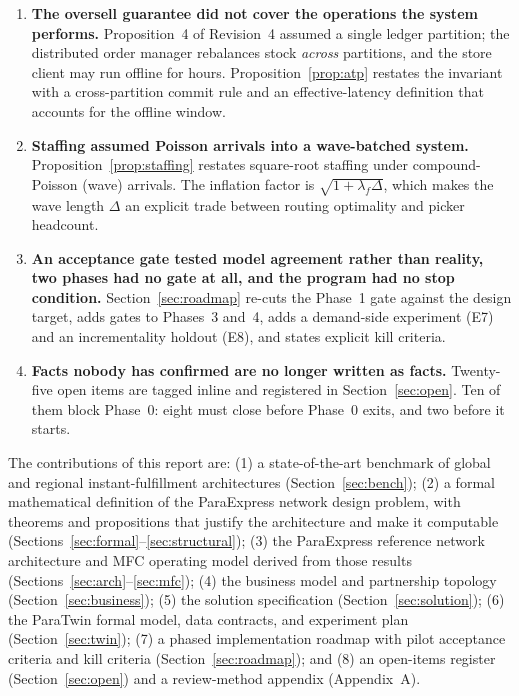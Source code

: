 \begin{enumerate}
\item \textbf{The oversell guarantee did not cover the operations the system performs.} Proposition~4 of Revision~4 assumed a single ledger partition; the distributed order manager rebalances stock \emph{across} partitions, and the store client may run offline for hours. Proposition~\ref{prop:atp} restates the invariant with a cross-partition commit rule and an effective-latency definition that accounts for the offline window.
\item \textbf{Staffing assumed Poisson arrivals into a wave-batched system.} Proposition~\ref{prop:staffing} restates square-root staffing under compound-Poisson (wave) arrivals. The inflation factor is $\sqrt{1+\lambda_f\Delta}$, which makes the wave length $\Delta$ an explicit trade between routing optimality and picker headcount.
\item \textbf{An acceptance gate tested model agreement rather than reality, two phases had no gate at all, and the program had no stop condition.} Section~\ref{sec:roadmap} re-cuts the Phase~1 gate against the design target, adds gates to Phases~3 and~4, adds a demand-side experiment (E7) and an incrementality holdout (E8), and states explicit kill criteria.
\item \textbf{Facts nobody has confirmed are no longer written as facts.} Twenty-five open items are tagged inline and registered in Section~\ref{sec:open}. Ten of them block Phase~0: eight must close before Phase~0 exits, and two before it starts.
\end{enumerate}

The contributions of this report are: (1) a state-of-the-art benchmark of global and regional instant-fulfillment architectures (Section~\ref{sec:bench}); (2) a formal mathematical definition of the ParaExpress network design problem, with theorems and propositions that justify the architecture and make it computable (Sections~\ref{sec:formal}--\ref{sec:structural}); (3) the ParaExpress reference network architecture and MFC operating model derived from those results (Sections~\ref{sec:arch}--\ref{sec:mfc}); (4) the business model and partnership topology (Section~\ref{sec:business}); (5) the solution specification (Section~\ref{sec:solution}); (6) the ParaTwin formal model, data contracts, and experiment plan (Section~\ref{sec:twin}); (7) a phased implementation roadmap with pilot acceptance criteria and kill criteria (Section~\ref{sec:roadmap}); and (8) an open-items register (Section~\ref{sec:open}) and a review-method appendix (Appendix~A).
